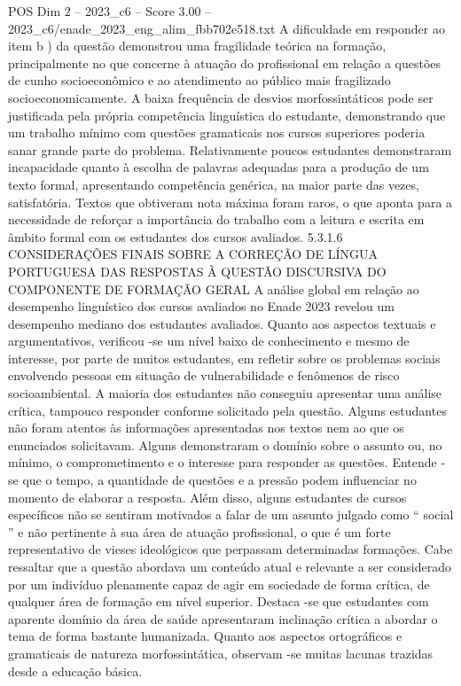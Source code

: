 \begin{textsample}{POS Dim 2 – 2023\_c6 – Score 3.00 – 2023\_c6/enade\_2023\_eng\_alim\_fbb702e518.txt}
A dificuldade em responder ao item b ) da questão demonstrou uma fragilidade teórica na formação, principalmente no que concerne à atuação do profissional em relação a questões de cunho socioeconômico e ao atendimento ao público mais fragilizado socioeconomicamente.
A baixa frequência de desvios morfossintáticos pode ser justificada pela própria competência linguística do estudante, demonstrando que um trabalho mínimo com questões gramaticais nos cursos superiores poderia sanar grande parte do problema.
Relativamente poucos estudantes demonstraram incapacidade quanto à escolha de palavras adequadas para a produção de um texto formal, apresentando competência genérica, na maior parte das vezes, satisfatória.
Textos que obtiveram nota máxima foram raros, o que aponta para a necessidade de reforçar a importância do trabalho com a leitura e escrita em âmbito formal com os estudantes dos cursos avaliados. 5.3.1.6 CONSIDERAÇÕES FINAIS SOBRE A CORREÇÃO DE LÍNGUA PORTUGUESA DAS RESPOSTAS À QUESTÃO DISCURSIVA DO COMPONENTE DE FORMAÇÃO GERAL A análise global em relação ao desempenho linguístico dos cursos avaliados no Enade 2023 revelou um desempenho mediano dos estudantes avaliados.
Quanto aos aspectos textuais e argumentativos, verificou -se um nível baixo de conhecimento e mesmo de interesse, por parte de muitos estudantes, em refletir sobre os problemas sociais envolvendo pessoas em situação de vulnerabilidade e fenômenos de risco socioambiental.
A maioria dos estudantes não conseguiu apresentar uma análise crítica, tampouco responder conforme solicitado pela questão.
Alguns estudantes não foram atentos às informações apresentadas nos textos nem ao que os enunciados solicitavam.
Alguns demonstraram o domínio sobre o assunto ou, no mínimo, o comprometimento e o interesse para responder as questões.
Entende -se que o tempo, a quantidade de questões e a pressão podem influenciar no momento de elaborar a resposta.
Além disso, alguns estudantes de cursos específicos não se sentiram motivados a falar de um assunto julgado como “ social ” e não pertinente à sua área de atuação profissional, o que é um forte representativo de vieses ideológicos que perpassam determinadas formações.
Cabe ressaltar que a questão abordava um conteúdo atual e relevante a ser considerado por um indivíduo plenamente capaz de agir em sociedade de forma crítica, de qualquer área de formação em nível superior.
Destaca -se que estudantes com aparente domínio da área de saúde apresentaram inclinação crítica a abordar o tema de forma bastante humanizada.
Quanto aos aspectos ortográficos e gramaticais de natureza morfossintática, observam -se muitas lacunas trazidas desde a educação básica.

\end{textsample}
